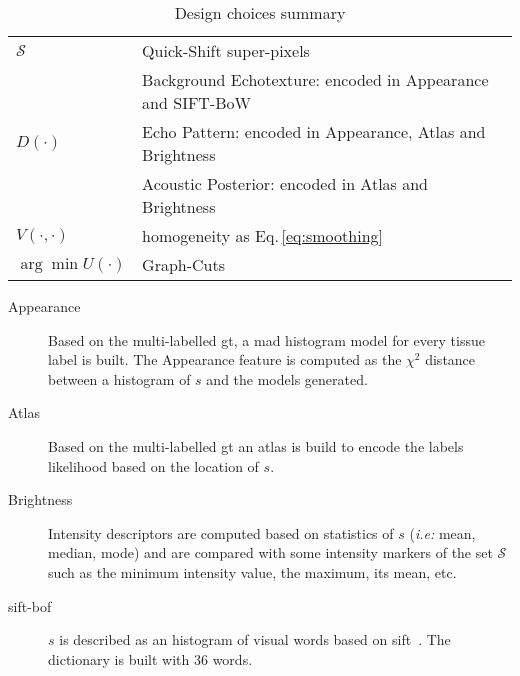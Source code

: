 \begin{table}[b]
  \centering
  \caption{Design choices summary}
  \label{tab:method}
  \renewcommand{\arraystretch}{1.3}
  \begin{tabular}{>{\centering\bfseries}m{1in} l}
    \hline 
    $\mathcal{S}$ & Quick-Shift super-pixels \\
    & Background Echotexture: encoded in Appearance and SIFT-BoW\\
    $D(\cdot)$ & Echo Pattern: encoded in Appearance, Atlas and Brightness\\%
    & Acoustic Posterior: encoded in Atlas and Brightness\\
    $V(\cdot,\cdot)$ & homogeneity as Eq.\,\eqref{eq:smoothing} \\
    $\arg \min U(\cdot)$ & Graph-Cuts \\ \hline
  \end{tabular}
\end{table}

\begin{description}
  \item[Appearance] 
    Based on the multi-labelled \ac{gt}, a \ac{mad} histogram model for every tissue label is built. The Appearance feature is computed as the $\chi^2$ distance between a histogram of $s$ and the models generated.
  \item[Atlas] 
    Based on the multi-labelled \ac{gt} an atlas is build to encode the labels likelihood based on the location of $s$.
  \item[Brightness] 
    Intensity descriptors are computed based on statistics of $s$ (\emph{i.e:} mean, median, mode) and  are compared with some intensity markers of the set $\mathcal{S}$ such as the minimum intensity value, the maximum, its mean, etc.
  \item[\ac{sift}-\ac{bof}]
    $s$ is described as an histogram of visual words based on \ac{sift}~\cite{massich2014sift}. The dictionary is built with $36$ words.
\end{description}

